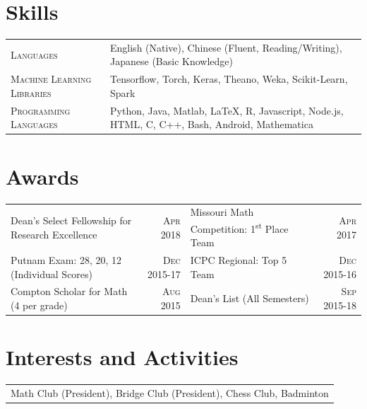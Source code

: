 \documentclass{article}
\begin{document}
\vspace{17pt}\section{Skills}
\begin{tabularx}{\textwidth}{l|X}
\textsc{Languages} & English (Native), Chinese (Fluent, Reading/Writing), Japanese (Basic Knowledge) \\
\textsc{Machine Learning Libraries} & Tensorflow, Torch, Keras, Theano, Weka, Scikit-Learn, Spark \\
\textsc{Programming Languages} & Python, Java, Matlab, \LaTeX, R, Javascript, Node.js, HTML, C, C++, Bash, Android, Mathematica\\
\end{tabularx}

\vspace{17pt}\section{Awards}
\begin{tabularx}{\textwidth}{Xr|Xr}
Dean's Select Fellowship for Research Excellence& \textsc{Apr} 2018 & Missouri Math Competition: 1\textsuperscript{st} Place Team & \textsc{Apr} 2017\\
Putnam Exam: 28, 20, 12 (Individual Scores) & \textsc{Dec} 2015-17 & ICPC Regional: Top 5 Team & \textsc{Dec} 2015-16 \\
Compton Scholar for Math (4 per grade)& \textsc{Aug} 2015 & Dean's List (All Semesters) & \textsc{Sep} 2015-18
\end{tabularx}


\vspace{17pt}\section{Interests and Activities}
\begin{tabularx}{\textwidth}{X}
Math Club (President), Bridge Club (President), Chess Club, Badminton
\end{tabularx}
\end{document}
